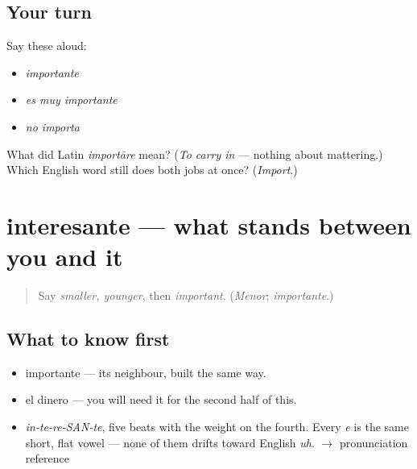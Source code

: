\subsection*{Your turn}
Say these aloud:

\begin{itemize}
\raggedright
  \item \emph{importante}
  \item \emph{es muy importante}
  \item \emph{no importa}
\end{itemize}

\begin{tcolorbox}[breakable,colback=teal!4,colframe=teal!35!black,title={Before you move on}]
What did Latin \emph{importāre} mean? (\emph{To carry in} — nothing about mattering.) Which English word still does both jobs at once? (\emph{Import}.)
\end{tcolorbox}
\section[interesante]{interesante — what stands between you and it}

\label{lesson:ES-C398-interesante}



\begin{quote}
Say \emph{smaller, younger}, then \emph{important}. (\emph{Menor}; \emph{importante}.)
\end{quote}

\subsection*{What to know first}
\begin{itemize}
\raggedright
  \item importante — its neighbour, built the same way.
  \item el dinero — you will need it for the second half of this.
\end{itemize}

\begin{sounds}
\begin{itemize}
\raggedright
  \item \emph{in-te-re-SAN-te}, five beats with the weight on the fourth. Every \emph{e} is the same short, flat vowel — none of them drifts toward English \emph{uh}. $\to$ pronunciation reference
\end{itemize}
\end{sounds}

